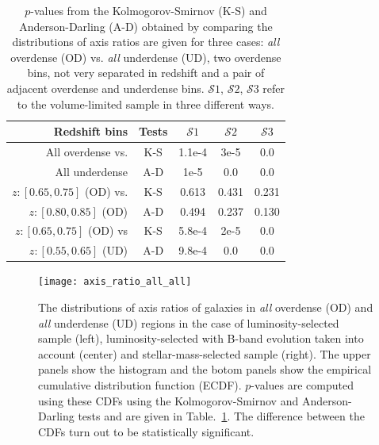 \documentclass[twocolumn,useAMS,usenatbib]{mn2e}
\newcommand{\s}{\ensuremath{\mathcal{S}}}
\begin{document}
\begin{table}
 \centering
 \begin{tabular}[\columnwidth]{ | r | c | c | c | c | }
  \hline
  Redshift bins & Tests & \s$1$ & \s$2$ & \s$3$ \\
  \hline
  All overdense vs. & K-S & 1.1e-4 & 3e-5 & 0.0 \\
  All underdense    & A-D & 1e-5 & 0.0 & 0.0 \\ \hline 
  $z:[0.65,0.75]$ (OD) vs. & K-S & 0.613 & 0.431 & 0.231 \\
  $z:[0.80,0.85]$ (OD) & A-D & 0.494 & 0.237 & 0.130 \\ \hline
  $z:[0.65,0.75]$ (OD) vs & K-S & 5.8e-4 & 2e-5 & 0.0 \\
  $z:[0.55,0.65]$ (UD) & A-D & 9.8e-4 & 0.0 & 0.0 \\ \hline
 \end{tabular}
 \caption{$p$-values from the Kolmogorov-Smirnov (K-S) and Anderson-Darling (A-D) obtained by comparing the distributions of axis ratios are given for three cases: \emph{all} overdense (OD) vs. \emph{all} underdense (UD), two overdense bins, not very separated in redshift and a pair of adjacent overdense and underdense bins. \s$1$, \s$2$, \s$3$ refer to the volume-limited sample in three different ways.}
 \label{table:pvalues_all}
\end{table}

\begin{figure}
 \centering
 \texttt{[image: axis\_ratio\_all\_all]}
 \caption{The distributions of axis ratios of galaxies in \emph{all} overdense (OD) and \emph{all} underdense (UD) regions in the case of luminosity-selected sample (left), luminosity-selected with B-band evolution taken into account (center) and stellar-mass-selected sample (right). The upper panels show the histogram
 and the botom panels show the empirical cumulative distribution function (ECDF). $p$-values are computed using these CDFs using the Kolmogorov-Smirnov and Anderson-Darling tests and are given in Table.~\ref{table:pvalues_all}. The difference between the CDFs turn out to be statistically significant.}
 \label{fig:axisratio_all}
\end{figure}
\end{document}
